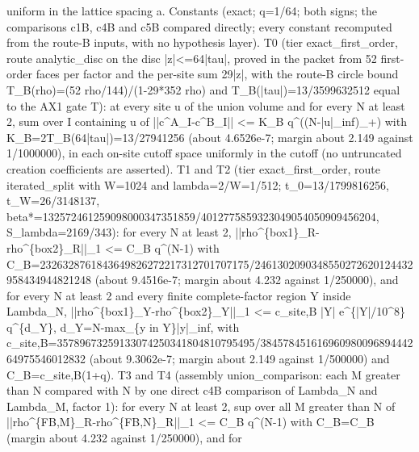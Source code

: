 \begin{gatequote}
uniform in the lattice spacing a. Constants (exact; q=1/64; both signs; the
comparisons c1B, c4B and c5B compared directly; every constant recomputed from
the route-B inputs, with no hypothesis layer). T0 (tier exact\_first\_order,
route analytic\_disc on the disc |z|<=64|tau|, proved in the packet from 52
first-order faces per factor and the per-site sum 29|z|, with the route-B
circle bound T\_B(rho)=(52 rho/144)/(1-29*352 rho) and
T\_B(|tau|)=13/3599632512 equal to the AX1 gate T\textquotesingle{}): at every
site u of the union volume and for every N at least 2, sum over I containing u
of ||c\textasciicircum{}A\_I-c\textasciicircum{}B\_I|| <= K\_B
q\textasciicircum{}((N-|u|\_inf)\_+) with K\_B=2T\_B(64|tau|)=13/27941256
(about 4.6526e-7; margin about 2.149 against 1/1000000), in each on-site
cutoff space uniformly in the cutoff (no untruncated creation coefficients are
asserted). T1 and T2 (tier exact\_first\_order, route iterated\_split with
W=1024 and lambda=2/W=1/512; t\_0=13/1799816256, t\_W=26/3148137,
beta*=132572461259098000347351859/4012775859323049054050909456204,
S\_lambda=2169/343): for every N at least 2,
||rho\textasciicircum{}\{box1\}\_R-rho\textasciicircum{}\{box2\}\_R||\_1 <=
C\_B q\textasciicircum{}(N-1) with
C\_B=23\allowbreak{}263287\allowbreak{}618436\allowbreak{}498262\allowbreak{}722173\allowbreak{}127017\allowbreak{}07175/\allowbreak{}246130\allowbreak{}209034\allowbreak{}855027\allowbreak{}262012\allowbreak{}443295\allowbreak{}843494\allowbreak{}482124\allowbreak{}8
(about 9.4516e-7; margin about 4.232 against 1/250000), and for every N at
least 2 and every finite complete-factor region Y inside Lambda\_N,
||rho\textasciicircum{}\{box1\}\_Y-rho\textasciicircum{}\{box2\}\_Y||\_1 <=
c\_site,B |Y| e\textasciicircum{}\{|Y|/10\textasciicircum{}8\}
q\textasciicircum{}\{d\_Y\}, d\_Y=N-max\_\{y in Y\}|y|\_inf, with
c\_site\allowbreak{},B=357\allowbreak{}896732\allowbreak{}591330\allowbreak{}742503\allowbreak{}418048\allowbreak{}107954\allowbreak{}95/384\allowbreak{}578451\allowbreak{}616960\allowbreak{}980096\allowbreak{}894442\allowbreak{}649755\allowbreak{}460128\allowbreak{}32
(about 9.3062e-7; margin about 2.149 against 1/500000) and
C\_B=c\_site,B(1+q). T3 and T4 (assembly union\_comparison: each M greater
than N compared with N by one direct c4B comparison of Lambda\_N and
Lambda\_M, factor 1): for every N at least 2, sup over all M greater than N of
||rho\textasciicircum{}\{FB,M\}\_R-rho\textasciicircum{}\{FB,N\}\_R||\_1 <=
C\textquotesingle{}\_B q\textasciicircum{}(N-1) with
C\textquotesingle{}\_B=C\_B (margin about 4.232 against 1/250000), and for

\end{gatequote}
